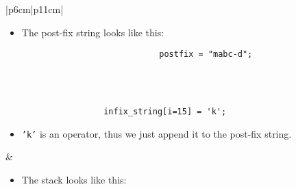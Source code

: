\begin{center}
\begin{longtable}{ |p{6cm}|p{11cm}| }
\begin{itemize}
                \item The post-fix string looks like this:
                    {
                        \begin{verbatim}
                            postfix = "mabc-d";
                        \end{verbatim}
                    }
            \end{itemize}
        \\ 
        \hline
        \hline
         \\
            \hline
            \hline
            {
                \begin{verbatim}
                    infix_string[i=15] = 'k';
                \end{verbatim}
            }
            \begin{itemize}
                \item \texttt{'k'} is an operator, thus we just append it to the post-fix string.
            \end{itemize}
        & 
        \begin{itemize}
            \item The stack looks like this: 
                {
                    \begin{center}
                        \begin{tabular}{ c }

\end{tabular}
\end{center}}
\end{itemize}
\end{longtable}
\end{center}
